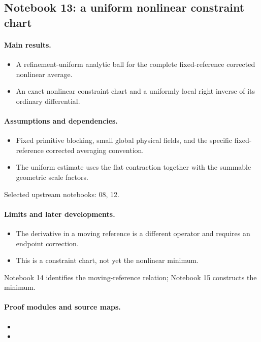 \documentclass[11pt]{article}
\theoremstyle{remark}
\begin{document}
\subsection{Notebook 13: a uniform nonlinear constraint chart}
\label{hnc-13}
\noindent{}\par

\paragraph{Main results.}
\begin{itemize}
\item A refinement-uniform analytic ball for the complete fixed-reference corrected nonlinear average.
\item An exact nonlinear constraint chart and a uniformly local right inverse of its ordinary differential.
\end{itemize}

\paragraph{Assumptions and dependencies.}
\begin{itemize}
\item Fixed primitive blocking, small global physical fields, and the specific fixed-reference corrected averaging convention.
\item The uniform estimate uses the flat contraction together with the summable geometric scale factors.
\end{itemize}

Selected upstream notebooks: 08, 12.\par

\paragraph{Limits and later developments.}
\begin{itemize}
\item The derivative in a moving reference is a different operator and requires an endpoint correction.
\item This is a constraint chart, not yet the nonlinear minimum.
\end{itemize}

Notebook 14 identifies the moving-reference relation; Notebook 15 constructs the minimum.

\paragraph{Proof modules and source maps.}
\begingroup\small
\begin{itemize}
\item {}
\item {}
\end{itemize}
\endgroup
\end{document}
